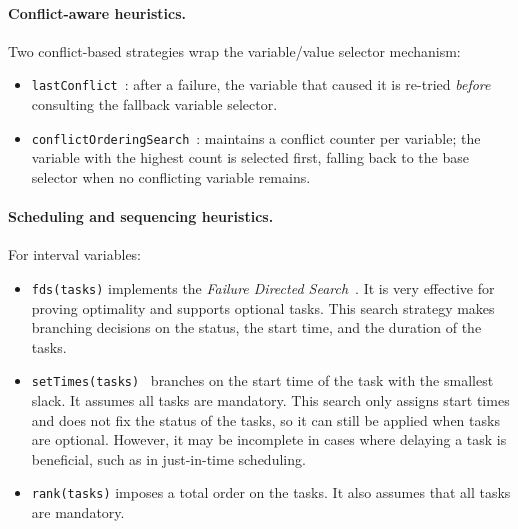 \documentclass[11pt, a4paper]{scrartcl}
\begin{document}
\paragraph{Conflict-aware heuristics.}
Two conflict-based strategies wrap the variable/value selector mechanism:
\begin{itemize}
    \item \texttt{lastConflict}~\cite{lecoutre2009reasoning}: after a failure, the variable that caused it is re-tried \emph{before} consulting the fallback variable selector.
    \item \texttt{conflictOrderingSearch}~\cite{conflictOrderingSearch}: maintains a conflict counter per variable; the variable with the highest count is selected first, falling back to the base selector when no conflicting variable remains.
\end{itemize}

\paragraph{Scheduling and sequencing heuristics.}
For interval variables:
\begin{itemize}
    \item \texttt{fds(tasks)} implements the \emph{Failure Directed Search}~\cite{failureDirectedSearch}.
          It is very effective for proving optimality and supports optional tasks.
          This search strategy makes branching decisions on the status, the start time, and the duration of the tasks.
    \item \texttt{setTimes(tasks)}~\cite{setTimes} branches on the start time of the task with the smallest slack.
          It assumes all tasks are mandatory. This search only assigns start times and does not fix the status of the tasks,
          so it can still be applied when tasks are optional.
          However, it may be incomplete in cases where delaying a task is beneficial, such as in just-in-time scheduling.
    \item \texttt{rank(tasks)} imposes a total order on the tasks. It also assumes that all tasks are mandatory.
\end{itemize}
\end{document}
